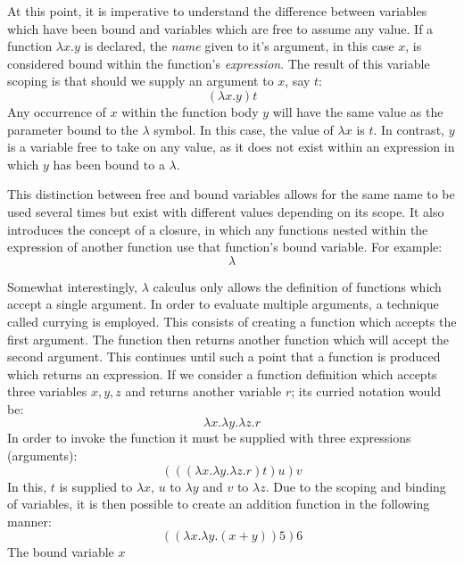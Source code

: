 \documentclass[12pt,a4paper]{article}
\begin{document}
At this point, it is imperative to understand the difference between variables which have been bound and variables which are free to assume any value. If a function $\lambda x.y$ is declared, the \emph{name} given to it's argument, in this case $x$, is considered bound within the function's \emph{expression}. The result of this variable scoping is that should we supply an argument to $x$, say $t$:
\begin{displaymath}
    (\lambda x.y)t
\end{displaymath}
Any occurrence of $x$ within the function body $y$ will have the same value as the parameter bound to the $\lambda$ symbol. In this case, the value of $\lambda x$ is $t$. In contrast, $y$ is a variable free to take on any value, as it does not exist within an expression in which $y$ has been bound to a $\lambda$.

This distinction between free and bound variables allows for the same name to be used several times but exist with different values depending on its scope. It also introduces the concept of a closure, in which any functions nested within the expression of another function use that function's bound variable. For example:
\begin{displaymath}
    \lambda
\end{displaymath}

Somewhat interestingly, $\lambda$ calculus only allows the definition of functions which accept a single argument. In order to evaluate multiple arguments, a technique called currying is employed. This consists of creating a function which accepts the first argument. The function then returns another function which will accept the second argument. This continues until such a point that a function is produced which returns an expression. If we consider a function definition which accepts three variables $x,y,z$ and returns another variable $r$; its curried notation would be:
\begin{displaymath}
    \lambda x. \lambda y. \lambda z.r
\end{displaymath}
In order to invoke the function it must be supplied with three expressions (arguments):
\begin{displaymath}
    (((\lambda x. \lambda y. \lambda z.r) t ) u ) v
\end{displaymath}
In this, $t$ is supplied to $\lambda x$, $u$ to $\lambda y$ and $v$ to $\lambda z$. Due to the scoping and binding of variables, it is then possible to create an addition function in the following manner:
\begin{displaymath}
    ((\lambda x. \lambda y.(x+y))5)6
\end{displaymath}
The bound variable $x$  
\end{document}

